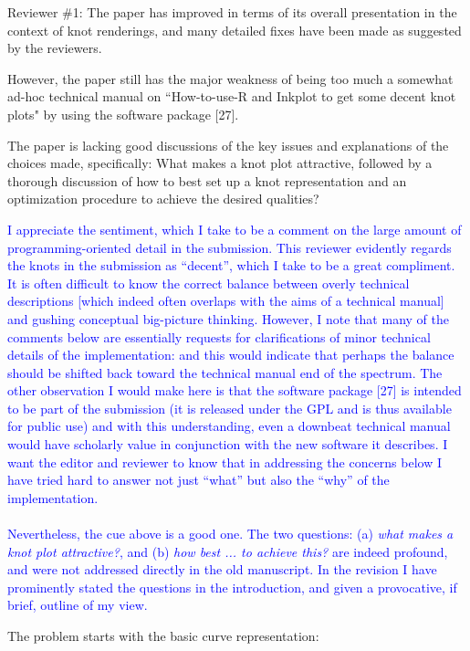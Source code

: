 \documentclass[12pt]{article}
\begin{document}
Reviewer \#1: The paper has improved in terms of its overall
presentation in the context of knot renderings, and many detailed
fixes have been made as suggested by the reviewers.

However, the paper still has the major weakness of being too much a
somewhat ad-hoc technical manual on ``How-to-use-R and Inkplot to get
some decent knot plots" by using the software package [27].


The paper is lacking good discussions of the key issues and
explanations of the choices made, specifically: What makes a knot plot
attractive, followed by a thorough discussion of how to best set up a
knot representation and an optimization procedure to achieve the
desired qualities?

\textcolor{blue}{I appreciate the sentiment, which I take to be a
  comment on the large amount of programming-oriented detail in the
  submission.  This reviewer evidently regards the knots in the
  submission as ``decent'', which I take to be a great compliment.  It
  is often difficult to know the correct balance between overly
  technical descriptions [which indeed often overlaps with the aims of
    a technical manual] and gushing conceptual big-picture thinking.
  However, I note that many of the comments below are essentially
  requests for clarifications of minor technical details of the
  implementation: and this would indicate that perhaps the balance
  should be shifted back toward the technical manual end of the
  spectrum.  The other observation I would make here is that the
  software package [27] is intended to be part of the submission (it
  is released under the GPL and is thus available for public use) and
  with this understanding, even a downbeat technical manual would have
  scholarly value in conjunction with the new software it describes.
  I want the editor and reviewer to know that in addressing the
  concerns below I have tried hard to answer not just ``what'' but
  also the ``why'' of the implementation.  \\ \\ Nevertheless, the cue
  above is a good one.  The two questions: (a) {\em what makes a knot
    plot attractive?}, and (b) {\em how best ... to achieve this?}
  are indeed profound, and were not addressed directly in the old
  manuscript.  In the revision I have prominently stated the questions
  in the introduction, and given a provocative, if brief, outline of
  my view.}


The problem starts with the basic curve representation:
\end{document}
